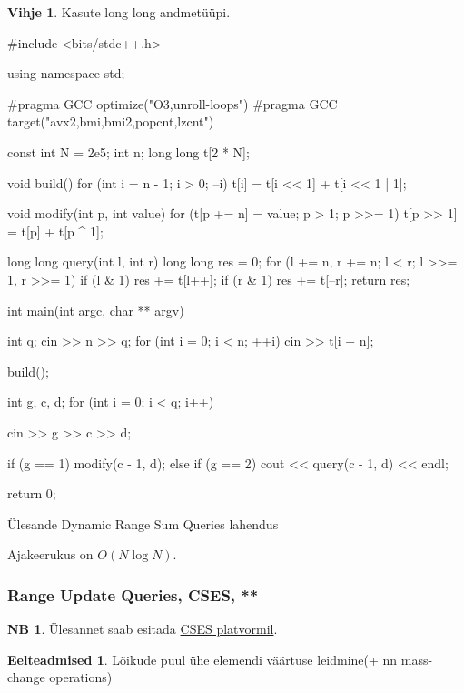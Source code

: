 \documentclass{trkut}
\theoremstyle{definition}
\newtheorem*{prereq}{Eelteadmised}
\newtheorem*{extra}{NB}
\newtheorem*{vihje}{Vihje}
\begin{document}
\begin{vihje}
Kasute long long andmetüüpi.
\end{vihje}

\begin{cclol}
#include <bits/stdc++.h>

using namespace std;

#pragma GCC optimize("O3,unroll-loops")
#pragma GCC target("avx2,bmi,bmi2,popcnt,lzcnt")

const int N = 2e5;
int n;
long long t[2 * N];

void build() {
  for (int i = n - 1; i > 0; --i) t[i] = t[i << 1] + t[i << 1 | 1];
}

void modify(int p, int value) {
  for (t[p += n] = value; p > 1; p >>= 1) t[p >> 1] = t[p] + t[p ^ 1];
}

long long query(int l, int r) {
  long long res = 0;
  for (l += n, r += n; l < r; l >>= 1, r >>= 1) {
    if (l & 1) res += t[l++];
    if (r & 1) res += t[--r];
  }
  return res;
}

int main(int argc, char ** argv) {
  int q;
  cin >> n >> q;
  for (int i = 0; i < n; ++i) cin >> t[i + n];

  build();

  int g, c, d;
  for (int i = 0; i < q; i++) {
    cin >> g >> c >> d;

    if (g == 1) modify(c - 1, d);
    else if (g == 2) cout << query(c - 1, d) << endl;
  }

  return 0;
}
\end{cclol}
 \begin{kk}[H]%
    \caption{Ülesande Dynamic Range Sum Queries lahendus}%
    \label{mkm}%
    \end{kk}

Ajakeerukus on $O(N\log N)$.

\subsubsection{Range Update Queries, CSES, **}
\begin{extra}
Ülesannet saab esitada \href{https://cses.fi/problemset/task/1651}{CSES platvormil}.
\end{extra}
\begin{prereq}
Lõikude puul ühe elemendi väärtuse leidmine(+ nn mass-change operations)
\end{prereq}
\end{document}
